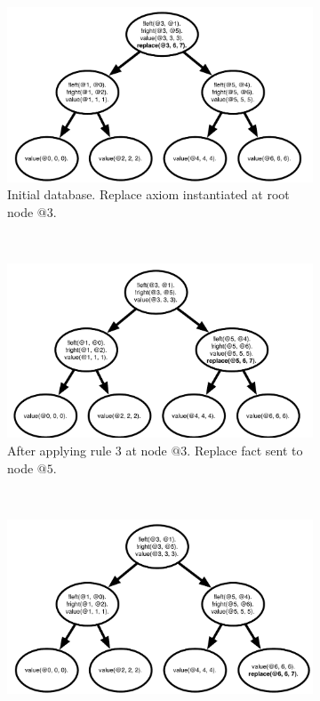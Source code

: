 \begin{figure}[h]
   \vspace{-0.75\intextsep}
        \centering
        \begin{subfigure}[b]{0.5\textwidth}
                \includegraphics[width=\textwidth]{btree_trace1}
                \caption{Initial database. Replace axiom instantiated at root node $@3$.}
                \label{fig:btree_trace1}
        \end{subfigure}%
        ~
        \begin{subfigure}[b]{0.5\textwidth}
                \includegraphics[width=\textwidth]{btree_trace2}
                \caption{After applying rule 3 at node $@3$. Replace fact sent to node $@5$.}
                \label{fig:btree_trace2}
        \end{subfigure}\\
        \begin{subfigure}[b]{0.5\textwidth}
                \includegraphics[width=\textwidth]{btree_trace3}

\end{subfigure}
\end{figure}
